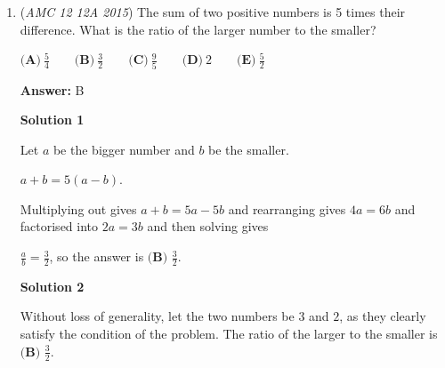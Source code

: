 \begin{enumerate}
 \textbf{Answer: }A



\textbf{Solution}

If the average of the first $14$ peoples' scores was $80$, then the sum of all of their tests is $14 \cdot 80 = 1120$.  When Payton's score was added, the sum of all of the scores became $15 \cdot 81 = 1215$.  So, Payton's score must be $1215-1120 = \boxed{\textbf{(E) }95}$

 \textbf{Alternate Solution} The average of a set of numbers is the value we get if we evenly distribute the total across all entries. So assume that the first $14$ students each scored $80$. If Payton also scored an $80$, the average would still be $80$. In order to increase the overall average to $81$, we need to add one more point to all of the scores, including Payton's. This means we need to add a total of $15$ more points, so Payton needs $80+15 = \boxed{\textbf{(E) }95}$
\begin{verbatim}
\href{https://youtu.be/TZtbmvFyGic}{https://youtu.be/TZtbmvFyGic}
\end{verbatim}





	\item (\textit{AMC 12 12A 2015}) The sum of two positive numbers is 5 times their difference. What is the ratio of the larger number to the smaller?


 $\textbf{(A)}\ \frac54 \qquad\textbf{(B)}\ \frac32 \qquad\textbf{(C)}\ \frac95 \qquad\textbf{(D)}\ 2 \qquad\textbf{(E)}\ \frac52$

 \textbf{Answer: }B



\textbf{Solution 1}

Let $a$ be the bigger number and $b$ be the smaller.

 $a + b = 5(a - b)$.

 Multiplying out gives $a + b = 5a - 5b$ and rearranging gives $4a = 6b$ and factorised into $2a = 3b$ and then solving gives

 $\frac{a}{b} = \frac32$, so the answer is $\boxed{\textbf{(B) }\frac32}$.

 



\textbf{Solution 2}

Without loss of generality, let the two numbers be $3$ and $2$, as they clearly satisfy the condition of the problem. The ratio of the larger to the smaller is $\boxed{\textbf{(B) }\frac32}$.


\end{enumerate}

